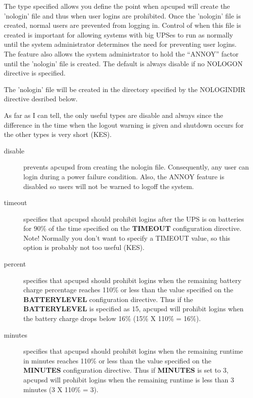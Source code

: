 {{{{{{{\begin{description}
The type specified allows you define the point when apcupsd will create the
'nologin' file and thus when user logins are prohibited. Once the
'nologin' file is created, normal users are prevented from logging in.
Control of when this file is created is important for allowing systems with
big UPSes to run as normally until the system administrator determines the
need for preventing user logins. The feature also allows the system
administrator to hold the ``ANNOY'' factor until the 'nologin' file is
created. The default is always disable if no NOLOGON directive is specified.  

The 'nologin' file will be created in the directory specified by the 
NOLOGINDIR directive desribed below.

As far as I can tell, the only useful types are disable and always since the
difference in the time when the logout warning is given and shutdown occurs
for the other types is very short (KES).  

\begin{description}

\item [disable]
   prevents apcupsd from creating the nologin file.  Consequently, any user can
login during a power failure condition.  Also, the ANNOY feature is disabled
so users will not be warned to logoff the system.  

\item [timeout]
   specifies that apcupsd should prohibit logins after the UPS is on batteries
for 90\% of the time specified on the {\bf TIMEOUT} configuration directive.
Note! Normally you don't want to specify a TIMEOUT value, so this option is
probably not too useful (KES).  

\item [percent]
   specifies that apcupsd should prohibit logins when the remaining battery
charge percentage reaches 110\% or less than the value specified on the {\bf
BATTERYLEVEL} configuration directive. Thus if the {\bf BATTERYLEVEL} is
specified as 15, apcupsd will prohibit logins when the battery charge drops
below 16\% (15\% X 110\% = 16\%).  

\item [minutes]
   specifies that apcupsd should prohibit logins when the remaining runtime in
minutes reaches 110\% or less than the value specified on the {\bf MINUTES}
configuration directive.  Thus if {\bf MINUTES} is set to 3, apcupsd will
prohibit logins when the remaining runtime is less than 3 minutes (3 X 110\% =
3).  


\end{description}
\end{description}}}}}}}}
